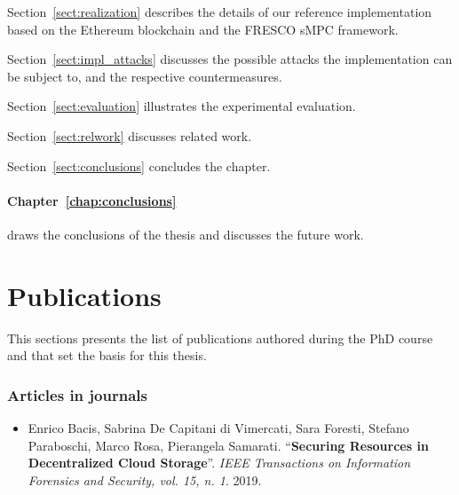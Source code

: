 {\begin{compactitem}
\item Section~\ref{sect:realization} describes the details of our reference implementation based on the Ethereum blockchain and the FRESCO sMPC framework.

\item Section~\ref{sect:impl_attacks} discusses the possible attacks the implementation can be subject to, and the respective countermeasures.

\item Section~\ref{sect:evaluation} illustrates the experimental evaluation.

\item Section~\ref{sect:relwork} discusses related work.

\item Section~\ref{sect:conclusions} concludes the chapter.
\end{compactitem}

\medskip

\paragraph*{Chapter~\ref{chap:conclusions}} draws the conclusions of the thesis and discusses the future work.

\bigskip

%

\clearpage
\section{Publications}

This sections presents the list of publications authored during the PhD course and that set the basis for this thesis.
			
\subsubsection*{Articles in journals}
\begin{itemize}
	\nocite{tifs}
	\item Enrico Bacis, Sabrina De Capitani di Vimercati, Sara Foresti, Stefano Paraboschi,	Marco Rosa,	Pierangela Samarati. ``\textbf{Securing Resources in Decentralized Cloud Storage}''. {\em IEEE Transactions on Information Forensics and Security, vol. 15, n. 1}. 2019.
\end{itemize}

}
